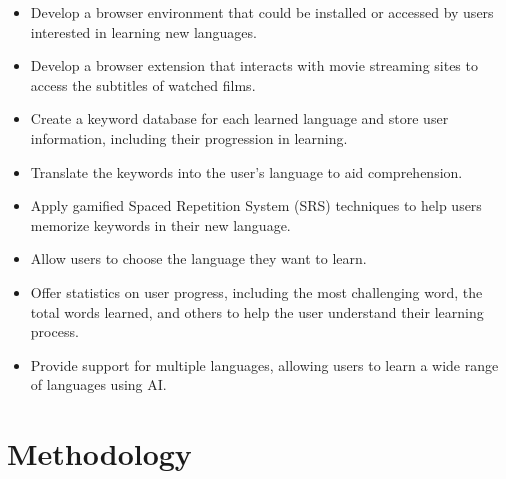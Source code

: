 \documentclass[12pt]{article}
\begin{document}
\begin{itemize}
\item Develop a browser environment that could be installed or accessed by users interested in learning new languages.
\item Develop a browser extension that interacts with movie streaming sites to access the subtitles of watched films.
\item Create a keyword database for each learned language and store user information, including their progression in learning.
\item Translate the keywords into the user's language to aid comprehension.
\item Apply gamified Spaced Repetition System (SRS) techniques to help users memorize keywords in their new language.
\item Allow users to choose the language they want to learn.
\item Offer statistics on user progress, including the most challenging word, the total words learned, and others to help the user understand their learning process.
\item Provide support for multiple languages, allowing users to learn a wide range of languages using AI.
\end{itemize}


\section{Methodology}
\end{document}
